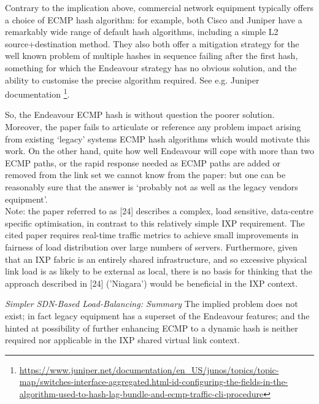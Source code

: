     
\bigskip

Contrary to the implication above, commercial network equipment typically offers a choice of ECMP hash algorithm: for example, both Cisco and Juniper have a remarkably wide range of default hash algorithms, including a simple L2 source+destination method.
They also both offer a mitigation strategy for the well known problem of multiple hashes in sequence failing after the first hash, something for which the Endeavour strategy has no obvious solution, and the ability to customise the precise algorithm required.
See e.g. Juniper documentation \footnote{\url{https://www.juniper.net/documentation/en\_US/junos/topics/topic-map/switches-interface-aggregated.html-id-configuring-the-fields-in-the-algorithm-used-to-hash-lag-bundle-and-ecmp-traffic-cli-procedure}}.

\smallskip

So, the Endeavour ECMP hash is without question the poorer solution.
Moreover, the paper fails to articulate or reference any problem impact arising from existing `legacy' systems ECMP hash algorithms which would motivate this work.
On the other hand, quite how well Endeavour will cope with more than two ECMP paths, or the rapid response needed as ECMP paths are added or removed from the link set we cannot know from the paper: but one can be reasonably sure that the answer is `probably not as well as the legacy vendors equipment'.
\\
Note: the paper referred to as [24] describes a complex, load sensitive, data-centre specific optimisation, in contrast to this relatively simple IXP requirement.
The cited paper requires real-time traffic metrics to achieve small improvements in fairness of load distribution over large numbers of servers.
Furthermore, given that an IXP fabric is an entirely shared infrastructure, and so excessive physical link load is as likely to be external as local, there is no basis for thinking that the approach described in [24] ('Niagara') would be beneficial in the IXP context.


\smallskip

\emph{Simpler SDN-Based Load-Balancing: Summary}
The implied problem does not exist; in fact legacy equipment has a superset of the Endeavour features; and the hinted at possibility of further enhancing ECMP to a dynamic hash is neither required nor applicable in the IXP shared virtual link context.

\smallskip



